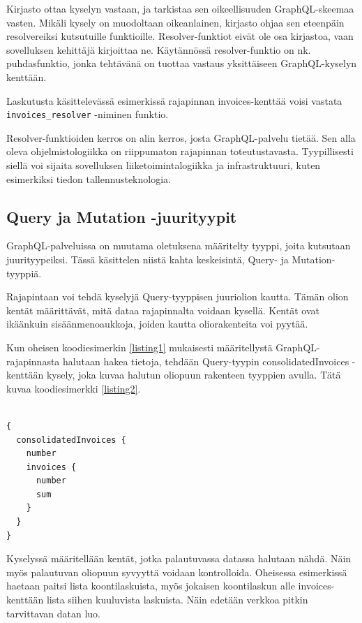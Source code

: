 Kirjasto ottaa kyselyn vastaan, ja tarkistaa sen oikeellisuuden
GraphQL-skeemaa vasten. Mikäli kysely on muodoltaan oikeanlainen,
kirjasto ohjaa sen eteenpäin resolvereiksi kutsutuille funktioille.
Resolver-funktiot eivät ole osa kirjastoa, vaan sovelluksen kehittäjä
kirjoittaa ne. Käytännössä resolver-funktio on nk. \gls{puhdasfunktio},
jonka tehtävänä on tuottaa vastaus yksittäiseen GraphQL-kyselyn
kenttään.

Laskutusta käsittelevässä esimerkissä rajapinnan invoices-kenttää voisi
vastata \texttt{invoices\_resolver} -niminen funktio.

Resolver-funktioiden kerros on alin kerros, josta GraphQL-palvelu
tietää. Sen alla oleva ohjelmistologiikka on riippumaton rajapinnan
toteutustavasta. Tyypillisesti siellä voi sijaita sovelluksen
liiketoimintalogiikka ja infrastruktuuri, kuten esimerkiksi tiedon
tallennusteknologia.

\hypertarget{query-ja-mutation--juurityypit}{%
\subsection{Query ja Mutation
-juurityypit}\label{query-ja-mutation--juurityypit}}

GraphQL-palveluissa on muutama oletuksena määritelty tyyppi, joita
kutsutaan juurityypeiksi. Tässä käsittelen niistä kahta keskeisintä,
Query- ja Mutation-tyyppiä.

Rajapintaan voi tehdä kyselyjä Query-tyyppisen juuriolion kautta. Tämän
olion kentät määrittävät, mitä dataa rajapinnalta voidaan kysellä.
Kentät ovat ikäänkuin sisäänmenoaukkoja, joiden kautta oliorakenteita
voi pyytää.

Kun oheisen koodiesimerkin \ref{listing1} mukaisesti määritellystä
GraphQL-rajapinnasta halutaan hakea tietoja, tehdään Query-tyypin
consolidatedInvoices -kenttään kysely, joka kuvaa halutun oliopuun
rakenteen tyyppien avulla. Tätä kuvaa koodiesimerkki \ref{listing2}.

\begin{code}
  \begin{verbatim}

{
  consolidatedInvoices {
    number
    invoices {
      number
      sum
    }
  }
}
\end{verbatim}
  \label{listing2}
\end{code}

Kyselyssä määritellään kentät, jotka palautuvassa datassa halutaan
nähdä. Näin myös palautuvan oliopuun syvyyttä voidaan kontrolloida.
Oheisessa esimerkissä haetaan paitsi lista koontilaskuista, myös
jokaisen koontilaskun alle invoices-kenttään lista siihen kuuluvista
laskuista. Näin edetään verkkoa pitkin tarvittavan datan luo.

